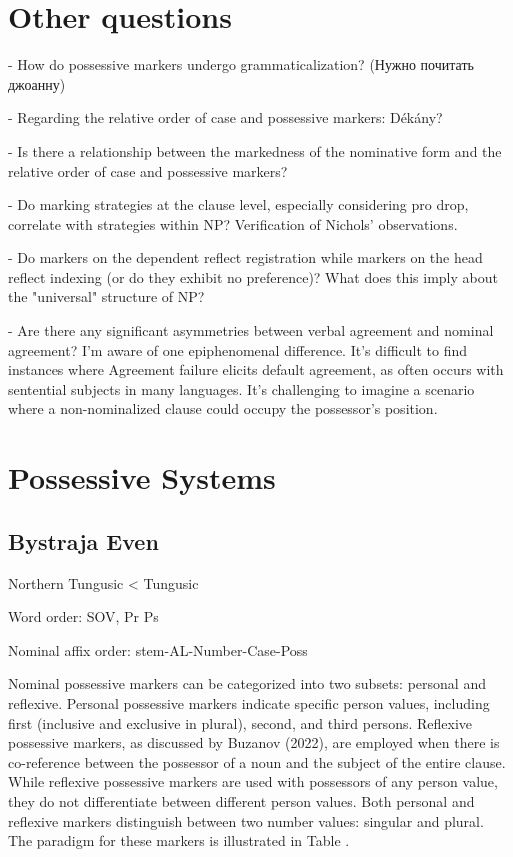 \section{Other questions}

- How do possessive markers undergo grammaticalization? (Нужно почитать джоанну)

- Regarding the relative order of case and possessive markers: Dékány?

- Is there a relationship between the markedness of the nominative form and the relative order of case and possessive markers?

- Do marking strategies at the clause level, especially considering pro drop, correlate with strategies within NP? Verification of Nichols' observations.

- Do markers on the dependent reflect registration while markers on the head reflect indexing (or do they exhibit no preference)? What does this imply about the "universal" structure of NP?

- Are there any significant asymmetries between verbal agreement and nominal agreement? I'm aware of one epiphenomenal difference. It's difficult to find instances where Agreement failure elicits default agreement, as often occurs with sentential subjects in many languages. It's challenging to imagine a scenario where a non-nominalized clause could occupy the possessor's position.


\section{Possessive Systems}
\subsection{Bystraja Even}

Northern Tungusic < Tungusic

Word order: SOV, Pr Ps

Nominal affix order: stem-AL-Number-Case-Poss

Nominal possessive markers can be categorized into two subsets: personal and reflexive. Personal possessive markers indicate specific person values, including first (inclusive and exclusive in plural), second, and third persons. Reflexive possessive markers, as discussed by Buzanov (2022), are employed when there is co-reference between the possessor of a noun and the subject of the entire clause. While reflexive possessive markers are used with possessors of any person value, they do not differentiate between different person values. Both personal and reflexive markers distinguish between two number values: singular and plural. The paradigm for these markers is illustrated in Table .

